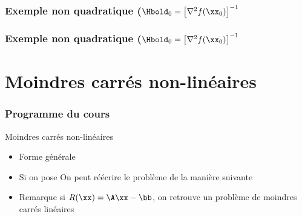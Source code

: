 \documentclass[9pt,table]{beamer} %
\begin{document}
\begin{frame}
\frametitle{Exemple non quadratique ($\Hbold_0 = \left[ \nabla^2 f(\xx_0) \right]^{-1}$}


\end{frame}

\begin{frame}
\frametitle{Exemple non quadratique ($\Hbold_0 = \left[ \nabla^2 f(\xx_0) \right]^{-1}$}


\end{frame}



\section{Moindres carrés non-linéaires}
\begin{frame}
\frametitle{Programme du cours}
\tableofcontents[currentsection]
\end{frame}



\begin{frame}{Moindres carrés non-linéaires}

\begin{itemize}[label=\tiny$\blacksquare$]
  \item Forme générale

\pause

\item Si on pose
On peut réécrire le problème de la manière suivante
  \item \alert{Remarque}
    si $R(\xx)= \A\xx - \bb$, on retrouve un problème de moindres carrés linéaires
   \end{itemize}
\end{frame}
\end{document}
